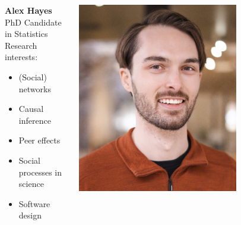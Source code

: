 \documentclass[aspectratio=169]{beamer}
\theoremstyle{remark}
\begin{document}

\begin{frame}
    \vfill
    \begin{columns}
        \begin{column}{0.5\textwidth}
            \textbf{Alex Hayes} \\
            PhD Candidate in Statistics \\
            \vspace{5mm}
            Research interests:
            \begin{itemize}
                \item (Social) networks
                \item Causal inference
                \item Peer effects
                \item Social processes in science
                \item Software design
            \end{itemize}
        \end{column}
        \begin{column}{0.5\textwidth}
            \centering
            \includegraphics[width=0.7\textwidth]{headshot-small.png}
        \end{column}
    \end{columns}
\end{frame}
\end{document}
